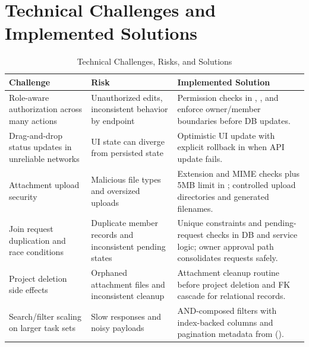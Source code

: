 \section{Technical Challenges and Implemented Solutions}

\begin{table}[H]
\centering
\small
\caption{Technical Challenges, Risks, and Solutions}
\begin{tabularx}{\textwidth}{L{0.26\textwidth}L{0.24\textwidth}X}
\toprule
\textbf{Challenge} & \textbf{Risk} & \textbf{Implemented Solution} \\
\midrule
Role-aware authorization across many actions &
Unauthorized edits, inconsistent behavior by endpoint &
Permission checks in , , and  enforce owner/member boundaries before DB updates. \\
Drag-and-drop status updates in unreliable networks &
UI state can diverge from persisted state &
Optimistic UI update with explicit rollback in  when API update fails. \\
Attachment upload security &
Malicious file types and oversized uploads &
Extension and MIME checks plus 5MB limit in ; controlled upload directories and generated filenames. \\
Join request duplication and race conditions &
Duplicate member records and inconsistent pending states &
Unique constraints and pending-request checks in DB and service logic; owner approval path consolidates requests safely. \\
Project deletion side effects &
Orphaned attachment files and inconsistent cleanup &
Attachment cleanup routine before project deletion and FK cascade for relational records. \\
Search/filter scaling on larger task sets &
Slow responses and noisy payloads &
AND-composed filters with index-backed columns and pagination metadata from  (). \\
\bottomrule
\end{tabularx}
\end{table}
